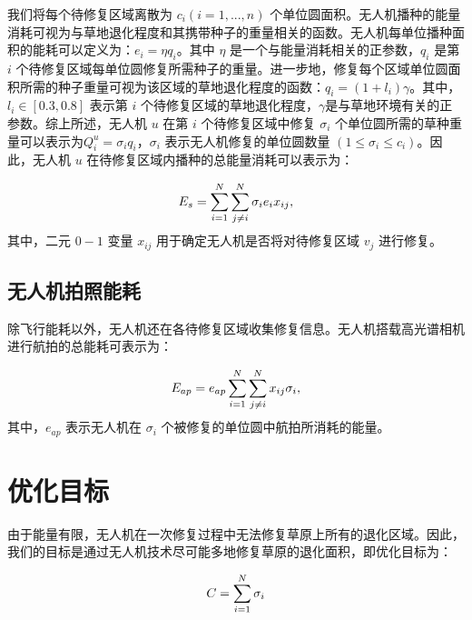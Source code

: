 \documentclass[AutoFakeBold]{LZUThesis}
\begin{document}
我们将每个待修复区域离散为 $c_i(i = 1, ..., n)$ 个单位圆面积。无人机播种的能量消耗可视为与草地退化程度和其携带种子的重量相关的函数。无人机每单位播种面积的能耗可以定义为：$e_i = \eta q_i$。其中 $\eta$ 是一个与能量消耗相关的正参数，$q_i$ 是第 $i$ 个待修复区域每单位圆修复所需种子的重量。进一步地，修复每个区域单位圆面积所需的种子重量可视为该区域的草地退化程度的函数\cite{klaus2017enriching}：$q_i = (1 + l_i) \gamma$。其中，$l_i \in [0.3, 0.8]$ 表示第 $i$ 个待修复区域的草地退化程度，$\gamma$是与草地环境有关的正参数。综上所述，无人机 $u$ 在第 $i$ 个待修复区域中修复 $\sigma_i$ 个单位圆所需的草种重量可以表示为$Q^u_i = \sigma_i q_i$，$\sigma_i$ 表示无人机修复的单位圆数量 $(1\leq\sigma_i\leq c_i)$。因此，无人机 $u$ 在待修复区域内播种的总能量消耗可以表示为：

\begin{equation} \label{seeding-energy}
	\begin{small}
		E_s = \sum^N_{i = 1}\sum^N_{j \neq i}\sigma_i e_i x_{ij},
	\end{small}
\end{equation}
其中，二元 $0-1$ 变量 $x_{ij}$ 用于确定无人机是否将对待修复区域 $v_j$ 进行修复。

\subsection{无人机拍照能耗}

除飞行能耗以外，无人机还在各待修复区域收集修复信息。无人机搭载高光谱相机进行航拍的总能耗可表示为：

\begin{equation} \label{hyper-spectral-camera-energy}
	\begin{scriptsize}
		E_{ap} = e_{ap}\sum^N_{i=1}\sum^N_{j \neq i} x_{ij}\sigma_i,
	\end{scriptsize}
\end{equation}
其中，$e_{ap}$ 表示无人机在 $\sigma_i$ 个被修复的单位圆中航拍所消耗的能量。

\section{优化目标}

由于能量有限，无人机在一次修复过程中无法修复草原上所有的退化区域。因此，我们的目标是通过无人机技术尽可能多地修复草原的退化面积，即优化目标为：

\begin{equation} \label{maximize-the-sum}
	\begin{small}
		C = \sum^N_{i=1}\sigma_i
	\end{small}
\end{equation}
\end{document}
